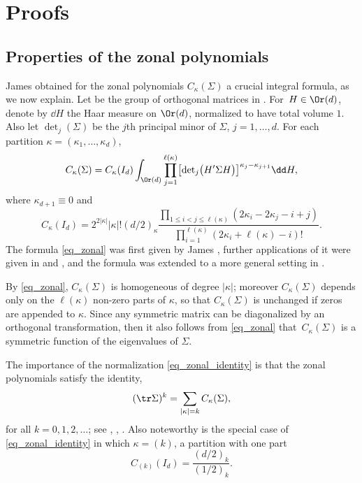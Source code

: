 \section{Proofs}\label{sec_proofs}

\subsection{Properties of the zonal polynomials}\label{sec_zonal_polys}

James \cite{James73} obtained for the zonal polynomials $C_\kappa(\Sigma)$ a crucial integral formula, as we now explain. Let  be the group of orthogonal matrices in . For~${H \in \Or(d)}$, denote by $\dd H$ the Haar measure on $\Or(d)$, normalized to have total volume $1$. Also let ${\det}_j(\Sigma)$ be the $j$th principal minor of $\Sigma$, $j=1,\ldots,d$. For each partition $\kappa = (\kappa_1,\ldots,\kappa_d)$,
\begin{gather}
\label{eq_zonal}
C_\kappa(\Sigma) = C_\kappa(I_d) \int_{\Or(d)} \prod_{j=1}^{\ell(\kappa)} \bigl[{\det}_j\bigl(H' \Sigma H\bigr)\bigr]^{\kappa_j-\kappa_{j+1}} \dd H,
\end{gather}
where $\kappa_{d+1} \equiv 0$ and
\begin{equation}
\label{eq_zonal_identity}
C_\kappa(I_d) = 2^{2 |\kappa|} |\kappa|! (d/2)_\kappa \frac{\prod\limits_{1 \le i < j \le \ell(\kappa)} (2\kappa_i - 2\kappa_j - i + j)}{\prod\limits_{i=1}^{\ell(\kappa)} (2\kappa_i + \ell(\kappa) - i)!}.
\end{equation}
The formula \eqref{eq_zonal} was first given by James \cite[equation~(10.4)]{James73}, further applications of it were given in \cite{Kushner} and \cite{Richards85}, and the formula was extended to a more general setting in \cite[Theorem~4.8]{GrossRichards}.

By \eqref{eq_zonal}, $C_\kappa(\Sigma)$ is homogeneous of degree $|\kappa|$; moreover $C_\kappa(\Sigma)$ depends only on the $\ell(\kappa)$ non-zero parts of $\kappa$, so that $C_\kappa(\Sigma)$ is unchanged if zeros are appended to $\kappa$. Since any symmetric matrix can be diagonalized by an orthogonal transformation, then it also follows from \eqref{eq_zonal} that~$C_\kappa(\Sigma)$ is a symmetric function of the eigenvalues of $\Sigma$.

The importance of the normalization \eqref{eq_zonal_identity} is that the zonal polynomials satisfy the identity,
\begin{equation}
\label{eq_trace_zonal}
(\tr \Sigma)^k = \sum_{|\kappa|=k} C_\kappa(\Sigma),
\end{equation}
for all $k=0,1,2,\ldots$; see \cite[p.~479, equation~(21)]{James64}, \cite[p.~228, equation~(iii)]{Muirhead}, \cite[equation~(35.4.6)]{Richards10}. Also noteworthy is the special case of \eqref{eq_zonal_identity} in which $\kappa = (k)$, a partition with one part
\begin{equation}
\label{eq_zonal_identity_1part}
C_{(k)}(I_d) = \frac{(d/2)_k}{(1/2)_k}.
\end{equation}

